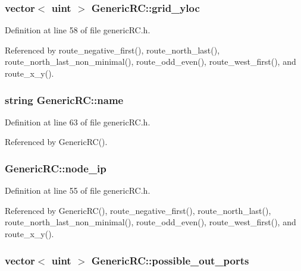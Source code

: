 \subsubsection[{grid\_\-yloc}]{\setlength{\rightskip}{0pt plus 5cm}vector$<$ {\bf uint} $>$ {\bf GenericRC::grid\_\-yloc}}\label{classGenericRC_89b5f8d2de4dc45ce64cbb0038ec0efa}




Definition at line 58 of file genericRC.h.

Referenced by route\_\-negative\_\-first(), route\_\-north\_\-last(), route\_\-north\_\-last\_\-non\_\-minimal(), route\_\-odd\_\-even(), route\_\-west\_\-first(), and route\_\-x\_\-y().
\subsubsection[{name}]{\setlength{\rightskip}{0pt plus 5cm}string {\bf GenericRC::name}\hspace{0.3cm}{\tt  [private]}}\label{classGenericRC_c16b221c60eff6945123ab68d2d4fe22}




Definition at line 63 of file genericRC.h.

Referenced by GenericRC().
\subsubsection[{node\_\-ip}]{ {\bf GenericRC::node\_\-ip}}\label{classGenericRC_f937d0d5d2df92a5be2641fb062f312e}




Definition at line 55 of file genericRC.h.

Referenced by GenericRC(), route\_\-negative\_\-first(), route\_\-north\_\-last(), route\_\-north\_\-last\_\-non\_\-minimal(), route\_\-odd\_\-even(), route\_\-west\_\-first(), and route\_\-x\_\-y().
\subsubsection[{possible\_\-out\_\-ports}]{\setlength{\rightskip}{0pt plus 5cm}vector$<$ {\bf uint} $>$ {\bf GenericRC::possible\_\-out\_\-ports}\hspace{0.3cm}{\tt  [private]}}\label{classGenericRC_e743374f2f9663fefa0da8d25f584568}




